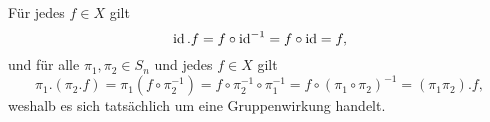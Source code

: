 \section{}





\addtocounter{subsection}{1}





\addtocounter{subsection}{1}





\addtocounter{subsection}{1}





\addtocounter{subsection}{1}





\addtocounter{subsection}{1}





\addtocounter{subsection}{1}





\subsection{}

Für jedes $f \in X$ gilt
\[
    \operatorname{id}.f
  = f \circ \operatorname{id}^{-1}
  = f \circ \operatorname{id}
  = f,
\]
und für alle $\pi_1, \pi_2 \in S_n$ und jedes $f \in X$ gilt
\[
    \pi_1.(\pi_2.f)
  = \pi_1(f \circ \pi_2^{-1})
  = f \circ \pi_2^{-1} \circ \pi_1^{-1}
  = f \circ (\pi_1 \circ \pi_2)^{-1}
  = (\pi_1 \pi_2).f,
\]
weshalb es sich tatsächlich um eine Gruppenwirkung handelt.

